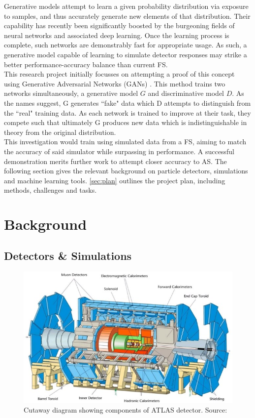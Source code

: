\documentclass{article}
\begin{document}
Generative models attempt to learn a given probability distribution via exposure to samples, and thus accurately generate new elements of that distribution. Their capability has recently been significantly boosted by the burgeoning fields of neural networks and associated deep learning. Once the learning process is complete, such networks are demonstrably fast for appropriate usage. As such, a generative model capable of learning to simulate detector responses may strike a better performance-accuracy balance than current FS. \\

This research project initially focusses on attempting a proof of this concept using Generative Adversarial Networks (GANs) \cite{gan1}. This method trains two networks simultaneously, a generative model $G$ and discriminative model $D$. As the names suggest, G generates ``fake" data which D attempts to distinguish from the ``real" training data. As each network is trained to improve at their task, they compete such that ultimately G produces new data which is indistinguishable in theory from the original distribution.\\

This investigation would train using simulated data from a FS, aiming to match the accuracy of said simulator while surpassing in performance. A successful demonstration merits further work to attempt closer accuracy to AS. The following section gives the relevant background on particle detectors, simulations and machine learning tools. \cref{sec:plan} outlines the project plan, including methods, challenges and tasks.

\section{Background}
\label{sec:background}



\subsection{Detectors \& Simulations}
\label{sec:detector}

\begin{figure}[H]
	\centering
	\includegraphics[width=0.8\linewidth]{img/atlasdetector}
	
	\caption{Cutaway diagram showing components of ATLAS detector. Source: \cite{atlaspic}}
	\label{fig:atlaspic}
	
\end{figure}
\end{document}
